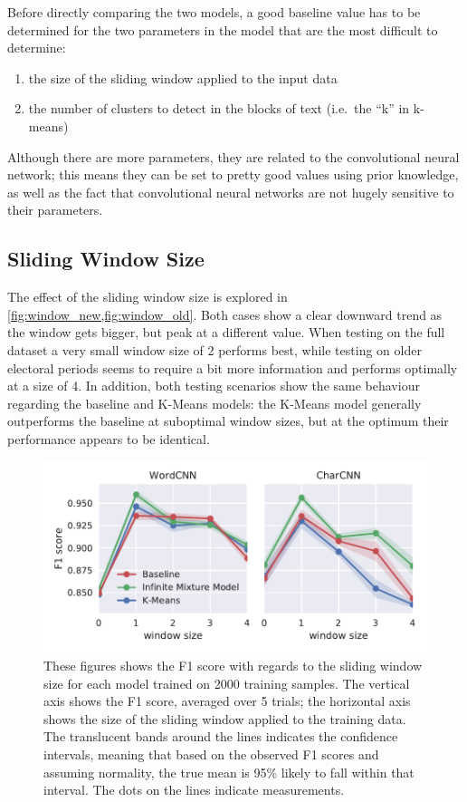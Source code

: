 Before directly comparing the two models, a good baseline value has to be
determined for the two parameters in the model that are the most difficult to
determine:
\begin{enumerate}
  \item the size of the sliding window applied to the input data
  \item the number of clusters to detect in the blocks of text (i.e.\ the ``k''
    in k-means)
\end{enumerate}
Although there are more parameters, they are related to the convolutional
neural network; this means they can be set to pretty good values using prior
knowledge, as well as the fact that convolutional neural networks are not hugely
sensitive to their parameters.

\subsection{Sliding Window Size}
The effect of the sliding window size is explored
in \cref{fig:window_new,fig:window_old}. Both cases show a clear downward trend as
the window gets bigger, but peak at a different value. When testing on the full
dataset a very small window size of 2 performs best, while testing on older
electoral periods seems to require a bit more information and performs optimally
at a size of 4. In addition, both testing scenarios show the same behaviour
regarding the baseline and K-Means models: the K-Means model generally
outperforms the baseline at suboptimal window sizes, but at the optimum their
performance appears to be identical.
\begin{figure}[p]
  \centering
  \includegraphics[width=\textwidth]{figures/results/2000-windowsize-old/tseries_f1.pdf}
  \caption{These figures shows the F1 score with regards to the sliding window
    size for each model trained on 2000 training samples.  The vertical axis
    shows the F1 score, averaged over 5 trials; the horizontal axis shows the
    size of the sliding window applied to the training data. The translucent
    bands around the lines indicates the confidence intervals, meaning that
    based on the observed F1 scores and assuming normality, the true mean is
    95\% likely to fall within that interval. The dots on the lines indicate
    measurements.\label{fig:window}}
\end{figure}

